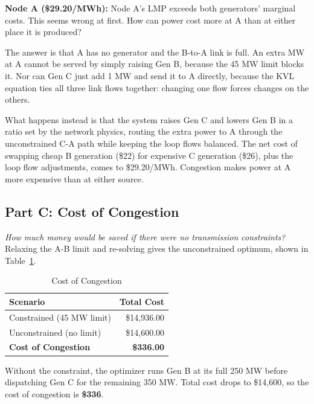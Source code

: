 \documentclass[journal, onecolumn, 12pt]{IEEEtran}
\begin{document}
\textbf{Node A (\$29.20/MWh):} Node A's LMP exceeds both generators' marginal costs. This seems wrong at first. How can power cost more at A than at either place it is produced? \par

The answer is that A has no generator and the B-to-A link is full. An extra MW at A cannot be served by simply raising Gen B, because the 45 MW limit blocks it. Nor can Gen C just add 1 MW and send it to A directly, because the KVL equation ties all three link flows together: changing one flow forces changes on the others. \par

What happens instead is that the system raises Gen C and lowers Gen B in a ratio set by the network physics, routing the extra power to A through the unconstrained C-A path while keeping the loop flows balanced. The net cost of swapping cheap B generation (\$22) for expensive C generation (\$26), plus the loop flow adjustments, comes to \$29.20/MWh. Congestion makes power at A more expensive than at either source.

\subsection{Part C: Cost of Congestion}
\textit{How much money would be saved if there were no transmission constraints?}\\

Relaxing the A-B limit and re-solving gives the unconstrained optimum, shown in Table~\ref{tab:congestion_cost}.

\begin{table}[h]
    \centering
    \caption{Cost of Congestion}
    \label{tab:congestion_cost}
    \begin{tabular}{@{}lr@{}}
    \toprule
    \textbf{Scenario} & \textbf{Total Cost} \\ \midrule
    Constrained (45 MW limit) & \$14,936.00 \\
    Unconstrained (no limit) & \$14,600.00 \\
    \textbf{Cost of Congestion} & \cellcolor{myred} \textbf{\$336.00} \\
    \bottomrule
    \end{tabular}
\end{table}

Without the constraint, the optimizer runs Gen B at its full 250 MW before dispatching Gen C for the remaining 350 MW. Total cost drops to \$14,600, so the cost of congestion is \textbf{\$336}. \par
\end{document}
